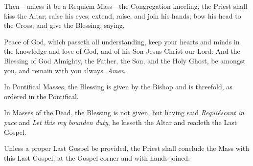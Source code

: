 \begin{rubric}
    Then---unless it be a Requiem Mass---the Congregation kneeling, the Priest shall kiss the Altar; raise his eyes; extend, raise, and join his hands; bow his head to the Cross; and give the Blessing, saying,
\end{rubric}
 Peace of God, which passeth all understanding, keep your hearts and minds in the knowledge and love of God, and of his Son Jesus Christ our Lord: And the Blessing of God Almighty, the Father, {} the Son, and the Holy Ghost, be amongst you, and remain with you always. \textit{Amen.}
\begin{rubric}
    In Pontifical Masses, the Blessing is given by the Bishop and is threefold, as ordered in the Pontifical.
\end{rubric}
\begin{rubric}
    In Masses of the Dead, the Blessing is not given, but having said \emph{Requiéscant in pace} and \emph{Let this my bounden duty}, he kisseth the Altar and readeth the Last Gospel.
\end{rubric}
\begin{rubric}
    Unless a proper Last Gospel be provided, the Priest shall conclude the Mass with this Last Gospel, at the Gospel corner and with hands joined:
\end{rubric}
